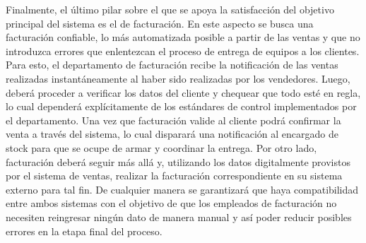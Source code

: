 Finalmente, el último pilar sobre el que se apoya la satisfacción del objetivo principal del sistema es el de facturación. En este aspecto se busca una facturación confiable, lo más automatizada posible a partir de las ventas y que no introduzca errores que enlentezcan el proceso de entrega de equipos a los clientes. Para esto, el departamento de facturación recibe la notificación de las ventas realizadas instantáneamente al haber sido realizadas por los vendedores. Luego, deberá proceder a verificar los datos del cliente y chequear que todo esté en regla, lo cual dependerá explícitamente de los estándares de control implementados por el departamento. Una vez que facturación valide al cliente podrá confirmar la venta a través del sistema, lo cual disparará una notificación al encargado de stock para que se ocupe de armar y coordinar la entrega. Por otro lado, facturación deberá seguir más allá y, utilizando los datos digitalmente provistos por el sistema de ventas, realizar la facturación correspondiente en su sistema externo para tal fin. De cualquier manera se garantizará que haya compatibilidad entre ambos sistemas con el objetivo de que los empleados de facturación no necesiten reingresar ningún dato de manera manual y así poder reducir posibles errores en la etapa final del proceso.

